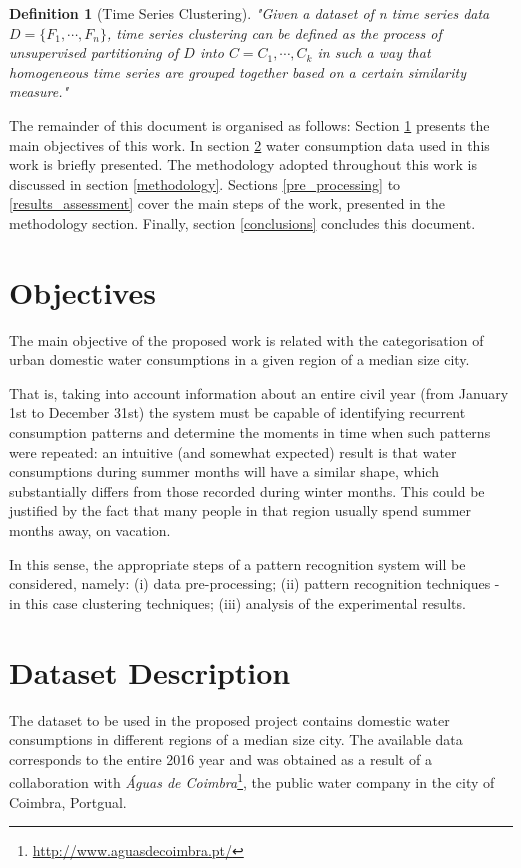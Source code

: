 \documentclass[9pt,journal,compsoc]{IEEEtran}
\newtheorem{mydef}{Definition}
\begin{document}
\begin{mydef}[Time Series Clustering]
	"Given a dataset of n time series data $D = \{F_{1}, \cdots , F_{n}\}$, time series clustering can be defined as the process of unsupervised partitioning of $D$ into $C = {C_{1}, \cdots , C_{k}}$ in such a way that homogeneous time series are grouped together based on a certain similarity measure."
\end{mydef}

The remainder of this document is organised as follows: Section \ref{objectives} presents the main objectives of this work. In section \ref{dataset_description} water consumption data used in this work is briefly presented. The methodology adopted throughout this work is discussed in section \ref{methodology}. Sections \ref{pre_processing} to \ref{results_assessment} cover the main steps of the work, presented in the methodology section. Finally, section \ref{conclusions} concludes this document.

\section{Objectives}
\label{objectives}

The main objective of the proposed work is related with the categorisation of urban domestic water consumptions in a given region of a median size city.

That is, taking into account information about an entire civil year (from January 1st to December 31st) the system must be capable of identifying recurrent consumption patterns and determine the moments in time when such patterns were repeated: an intuitive (and somewhat expected) result is that water consumptions during summer months will have a similar shape, which substantially differs from those recorded during winter months. This could be justified by the fact that many people in that region usually spend summer months away, on vacation.

In this sense, the appropriate steps of a pattern recognition system will be considered, namely: (i) data pre-processing; (ii) pattern recognition techniques - in this case clustering techniques; (iii) analysis of the experimental results.

\section{Dataset Description}
\label{dataset_description}

The dataset to be used in the proposed project contains domestic water consumptions in different regions of a median size city. The available data corresponds to the entire 2016 year and was obtained as a result of a collaboration with \emph{Águas de Coimbra}\footnote{\url{http://www.aguasdecoimbra.pt/}}, the public water company in the city of Coimbra, Portgual.
\end{document}
